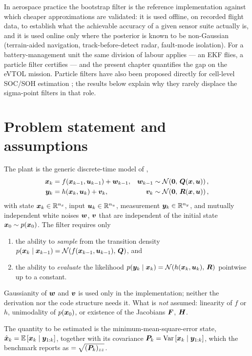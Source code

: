 In aerospace practice the bootstrap filter is the reference implementation against which cheaper
approximations are validated: it is used offline, on recorded flight data, to establish what the
achievable accuracy of a given sensor suite actually is, and it is used online only where the
posterior is known to be non-Gaussian (terrain-aided navigation, track-before-detect radar,
fault-mode isolation).  For a battery-management unit the same division of labour applies --- an
EKF flies, a particle filter certifies --- and the present chapter quantifies the gap on the eVTOL
mission.  Particle filters have also been proposed directly for cell-level SOC/SOH estimation
\cite{schwunk2013pf}; the results below explain why they rarely displace the sigma-point filters
in that role.

\section{Problem statement and assumptions}
The plant is the generic discrete-time model of ,
\begin{align}
  \bm{x}_k &= f(\bm{x}_{k-1}, \bm{u}_{k-1}) + \bm{w}_{k-1}, & \bm{w}_{k-1} &\sim \mathcal{N}\!\left(\bm{0},\,\bm{Q}(\bm{x},\bm{u})\right),
  \label{eq:pfb-dyn} \\
  \bm{y}_k &= h(\bm{x}_k, \bm{u}_k) + \bm{v}_k, & \bm{v}_k &\sim \mathcal{N}\!\left(\bm{0},\,\bm{R}(\bm{x},\bm{u})\right),
  \label{eq:pfb-meas}
\end{align}
with state $\bm{x}_k \in \mathbb{R}^{n_x}$, input $\bm{u}_k \in \mathbb{R}^{n_u}$, measurement
$\bm{y}_k \in \mathbb{R}^{n_y}$, and mutually independent white noises $\bm{w}$, $\bm{v}$ that are independent of
the initial state $\bm{x}_0 \sim p(\bm{x}_0)$.  The filter requires only
\begin{enumerate}[label=(A\arabic*),leftmargin=3em]
  \item the ability to \emph{sample} from the transition density
        $p(\bm{x}_k \mid \bm{x}_{k-1}) = \mathcal{N}\!\left(f(\bm{x}_{k-1},\bm{u}_{k-1}),\,\bm{Q}\right)$, and
  \item the ability to \emph{evaluate} the likelihood
        $p(\bm{y}_k \mid \bm{x}_k) = \mathcal{N}\!\left(h(\bm{x}_k,\bm{u}_k),\,\bm{R}\right)$ pointwise up to a constant.
\end{enumerate}
Gaussianity of $\bm{w}$ and $\bm{v}$ is used only in the implementation; neither the derivation nor the
code structure needs it.  What is \emph{not} assumed: linearity of $f$ or $h$, unimodality of
$p(\bm{x}_0)$, or existence of the Jacobians $\bm{F}$, $\bm{H}$.

The quantity to be estimated is the minimum-mean-square-error state,
$\hat{\bm{x}}_k = \mathbb{E}\left[\bm{x}_k \mid \bm{y}_{1:k}\right]$, together with its covariance
$\bm{P}_k = \operatorname{Var}\left[\bm{x}_k \mid \bm{y}_{1:k}\right]$, which the benchmark reports as
 $=\sqrt{(\bm{P}_k)_{zz}}$.

